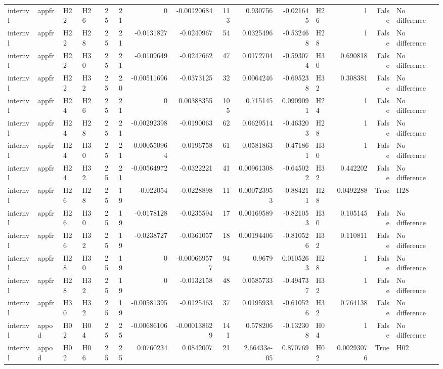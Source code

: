 \begin{longtable}{llllrrrrrrrlrrl}
internvl & appfr & H22 & H26 & 25 & 21 & 0 & -0.00120684 & 113 & 0.930756 & -0.021645 & H26 & 1 & False & No difference \\
internvl & appfr & H22 & H28 & 25 & 21 & -0.0131827 & -0.0240967 & 54 & 0.0325496 & -0.532468 & H28 & 1 & False & No difference \\
internvl & appfr & H22 & H30 & 25 & 21 & -0.0109649 & -0.0247662 & 47 & 0.0172704 & -0.593074 & H30 & 0.690818 & False & No difference \\
internvl & appfr & H22 & H32 & 25 & 20 & -0.00511696 & -0.0373125 & 32 & 0.0064246 & -0.695238 & H32 & 0.308381 & False & No difference \\
internvl & appfr & H24 & H26 & 25 & 21 & 0 & 0.00388355 & 105 & 0.715145 & 0.0909091 & H24 & 1 & False & No difference \\
internvl & appfr & H24 & H28 & 25 & 21 & -0.00292398 & -0.0190063 & 62 & 0.0629514 & -0.463203 & H28 & 1 & False & No difference \\
internvl & appfr & H24 & H30 & 25 & 21 & -0.000550964 & -0.0196758 & 61 & 0.0581863 & -0.471861 & H30 & 1 & False & No difference \\
internvl & appfr & H24 & H32 & 25 & 21 & -0.00564972 & -0.0322221 & 41 & 0.00961308 & -0.645022 & H32 & 0.442202 & False & No difference \\
internvl & appfr & H26 & H28 & 25 & 19 & -0.022054 & -0.0228898 & 11 & 0.000723953 & -0.884211 & H28 & 0.0492288 & True & H28 \\
internvl & appfr & H26 & H30 & 25 & 19 & -0.0178128 & -0.0235594 & 17 & 0.00169589 & -0.821053 & H30 & 0.105145 & False & No difference \\
internvl & appfr & H26 & H32 & 25 & 19 & -0.0238727 & -0.0361057 & 18 & 0.00194406 & -0.810526 & H32 & 0.110811 & False & No difference \\
internvl & appfr & H28 & H30 & 25 & 19 & 0 & -0.000669577 & 94 & 0.9679 & 0.0105263 & H28 & 1 & False & No difference \\
internvl & appfr & H28 & H32 & 25 & 19 & 0 & -0.0132158 & 48 & 0.0585733 & -0.494737 & H32 & 1 & False & No difference \\
internvl & appfr & H30 & H32 & 25 & 19 & -0.00581395 & -0.0125463 & 37 & 0.0195933 & -0.610526 & H32 & 0.764138 & False & No difference \\
internvl & appod & H02 & H04 & 25 & 25 & -0.00686106 & -0.000138629 & 141 & 0.578206 & -0.132308 & H04 & 1 & False & No difference \\
internvl & appod & H02 & H06 & 25 & 25 & 0.0760234 & 0.0842007 & 21 & 2.66433e-05 & 0.870769 & H02 & 0.00293076 & True & H02 \\

\end{longtable}
